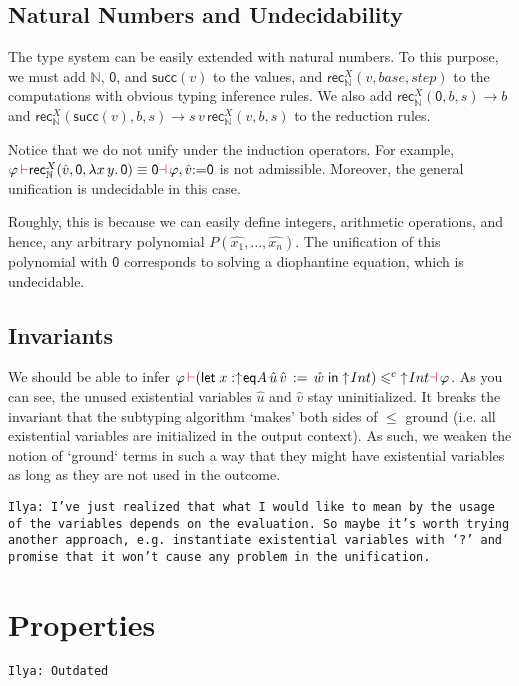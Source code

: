 \documentclass[a4,natbib=false]{article}
\newcommand{\ilyam}[1]{{\color{red} \texttt{Ilya:  #1}}}
\newcommand{\fun}[2]{\lambda {#1}.\,{#2}}
\newcommand{\letname}{\mathsf{let}}
\newcommand{\letval}[3]{\letname\; {#1} \,:=\, {#2} \;\mathsf{in}\; {#3}}
\newcommand{\valtocomp}[1]{\uparrow \hspace{-2pt} #1}
\newcommand{\eqtype}[3]{\mathsf{eq}{#1}\,{#2}\,{#3}}
\newcommand{\csubt}{\leqslant^c}
\newcommand{\evarassign}[2]{{#1} \mathsf{:=} {#2}}
\newcommand{\reduces}[2]{{#1} \rightarrow {#2}}
\newcommand{\nattype}{\mathbb{N}}
\newcommand{\natzero}{\mathsf{0}}
\newcommand{\natsucc}[1]{\mathsf{succ}({#1})}
\newcommand{\recnat}[4]{\mathsf{rec}_{\nattype}^{#2}({#1},{#3},{#4})}
\newcommand{\judgeacsubt}[4]{{#1}\,{\color{purple}\vdash} {#2} \csubt {#3} {\color{purple}\dashv}\,{#4}}
\newcommand{\judgeaequiv}[4]{{#1}\,{\color{purple}\vdash} {#2} \equiv {#3} {\color{purple}\dashv}\,{#4}}
\begin{document}
\subsection{Natural Numbers and Undecidability}

The type system can be easily extended with natural numbers. To this purpose, we
must add $\nattype$, $\natzero$, and $\natsucc{v}$ to the values, and
$\recnat{v}{X}{base}{step}$ to the computations with obvious typing inference
rules.
We also add $\reduces{\recnat{\natzero}{X}{b}{s}}{b}$ and
$\reduces{\recnat{\natsucc{v}}{X}{b}{s}}{s \, v \, \recnat{v}{X}{b}{s}}$ to the reduction rules.

Notice that we do not unify under the induction operators. For example,
$\judgeaequiv{\varphi}{\recnat{\hat{v}}{X}{\natzero}{\fun{x\,y}{\natzero}}}{\natzero}{\varphi, \evarassign{\hat{v}}{\natzero}}$
is not admissible.
Moreover, the general unification is undecidable in this case.

Roughly, this is because we can easily define integers,
arithmetic operations, and hence, any arbitrary polynomial
$P(\hat{x_1}, \dots, \hat{x_n})$.
The unification of this polynomial with $\natzero$
corresponds to solving a diophantine equation, which is undecidable.

\subsection{Invariants}

We should be able to infer
$\judgeacsubt{\varphi}{(\letval{x:\valtocomp{\eqtype{A}{\hat{u}}{\hat{v}}}}{\hat{w}}{\valtocomp{Int}})}{\valtocomp{Int}}{\varphi}$.
As you can see, the unused existential variables $\hat{u}$ and $\hat{v}$ stay uninitialized.
It breaks the invariant that the subtyping algorithm `makes' both sides of $\leqslant$ ground (i.e. all existential variables are initialized in the output context).
As such, we weaken the notion of `ground` terms in such a way that they might have existential variables as long as they are not used in the outcome.

\ilyam{I've just realized that what I would like to mean by the usage of the variables depends on the evaluation. So maybe it's worth trying another approach,
  e.g. instantiate existential variables with `?' and promise that it won't cause any problem in the unification. }


\section{Properties}
\ilyam{Outdated}
\end{document}
